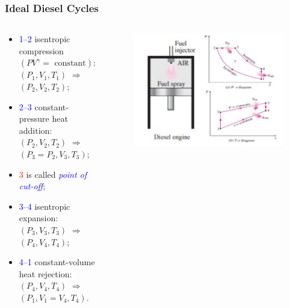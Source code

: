 \documentclass[10pt,compress]{beamer}
\begin{document}
\begin{frame}
 \frametitle{Ideal Diesel Cycles}
  \begin{columns}
   \begin{column}[c]{0.5\linewidth}
    \begin{itemize}
     \item <1-> \textcolor{blue}{1--2} isentropic compression $\left(PV^{\gamma}=\text{ constant}\right)$: $\left(P_{1},V_{1},T_{1}\right)$ $\Rightarrow$ $\left(P_{2},V_{2},T_{2}\right)$;
     \item <2-> \textcolor{blue}{2--3} constant-pressure heat addition: $\left(P_{2},V_{2},T_{2}\right)$ $\Rightarrow$ $\left(P_{3}=P_{2},V_{3},T_{3}\right)$;
     \item <3-> \textcolor{red}{$3$} is called \textcolor{blue}{{\it point of cut-off}};
     \item <4-> \textcolor{blue}{3--4} isentropic expansion: $\left(P_{3},V_{3},T_{3}\right)$ $\Rightarrow$ $\left(P_{4},V_{4},T_{4}\right)$;
     \item <5-> \textcolor{blue}{4--1} constant-volume heat rejection: $\left(P_{4},V_{4},T_{4}\right)$ $\Rightarrow$ $\left(P_{1},V_{1}=V_{4},T_{4}\right)$.
    \end{itemize}
   \end{column}
   \begin{column}[c]{0.5\linewidth}
    \begin{figure}%
     \begin{center}
      \includegraphics[width=6.cm,clip]{./Pics/InternalCombustion_IdealDieselCycle}
     \end{center}
    \end{figure}   
   \end{column}  
  \end{columns}
\end{frame}
\end{document}
